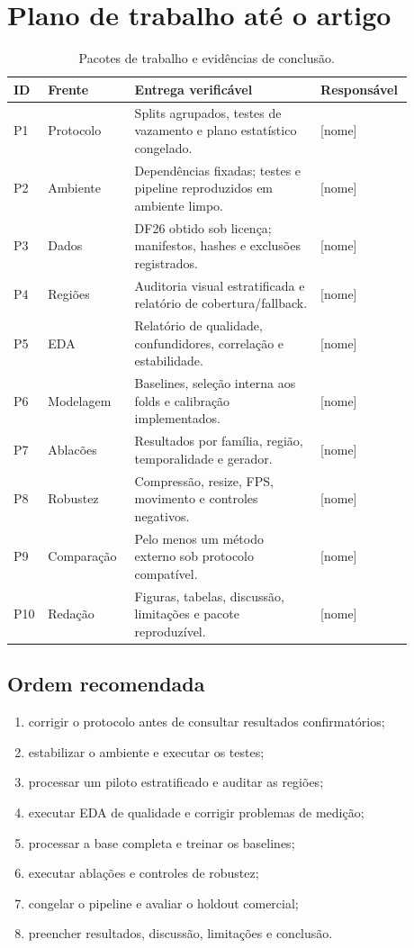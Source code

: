 \documentclass[11pt,a4paper]{article}
\begin{document}
\section{Plano de trabalho até o artigo}

\begin{table}[ht]
  \centering
  \small
  \caption{Pacotes de trabalho e evidências de conclusão.}
  \label{tab:plano}
  \begin{tabular}{p{0.05\linewidth}p{0.21\linewidth}p{0.45\linewidth}p{0.17\linewidth}}
    \toprule
    ID & Frente & Entrega verificável & Responsável \\
    \midrule
    P1 & Protocolo & Splits agrupados, testes de vazamento e plano estatístico congelado. & [nome] \\
    P2 & Ambiente & Dependências fixadas; testes e pipeline reproduzidos em ambiente limpo. & [nome] \\
    P3 & Dados & DF26 obtido sob licença; manifestos, hashes e exclusões registrados. & [nome] \\
    P4 & Regiões & Auditoria visual estratificada e relatório de cobertura/fallback. & [nome] \\
    P5 & EDA & Relatório de qualidade, confundidores, correlação e estabilidade. & [nome] \\
    P6 & Modelagem & Baselines, seleção interna aos folds e calibração implementados. & [nome] \\
    P7 & Ablacões & Resultados por família, região, temporalidade e gerador. & [nome] \\
    P8 & Robustez & Compressão, resize, FPS, movimento e controles negativos. & [nome] \\
    P9 & Comparação & Pelo menos um método externo sob protocolo compatível. & [nome] \\
    P10 & Redação & Figuras, tabelas, discussão, limitações e pacote reproduzível. & [nome] \\
    \bottomrule
  \end{tabular}
\end{table}

\subsection{Ordem recomendada}

\begin{enumerate}
  \item corrigir o protocolo antes de consultar resultados confirmatórios;
  \item estabilizar o ambiente e executar os testes;
  \item processar um piloto estratificado e auditar as regiões;
  \item executar EDA de qualidade e corrigir problemas de medição;
  \item processar a base completa e treinar os baselines;
  \item executar ablações e controles de robustez;
  \item congelar o pipeline e avaliar o holdout comercial;
  \item preencher resultados, discussão, limitações e conclusão.
\end{enumerate}
\end{document}
